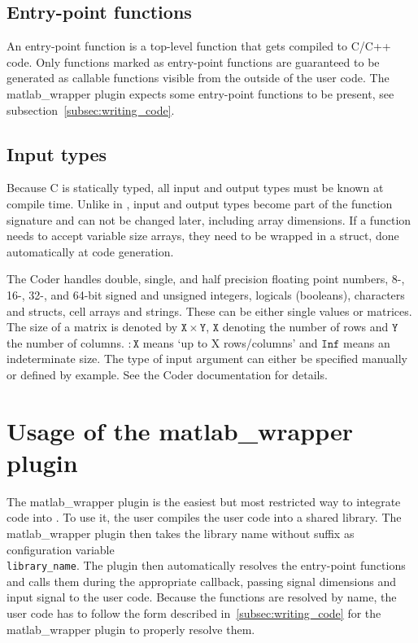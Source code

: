 \documentclass[11pt,a4paper,twoside]{article}
\newcommand{\+}{\discretionary{\mbox{\scriptsize$\hookleftarrow$}}{}{}}
\begin{document}
\subsection*{Entry-point functions}
An entry-point function is a top-level \Matlab{} function that gets compiled to
C/C++ code. Only functions marked as entry-point functions are guaranteed to be
generated as callable functions visible from the outside of the user code. The
matlab\_wrapper plugin expects some entry-point functions to be present, see
subsection~\ref{subsec:writing_code}.

\subsection*{Input types}
Because C is statically typed, all input and output types must be known at
compile time. Unlike in \Matlab{}, input and output types become part of the
function signature and can not be changed later, including array dimensions.
If a function needs to accept variable size arrays, they need to be wrapped
in a struct, done automatically at code generation.

The \Matlab{} Coder handles double, single, and half precision floating point
numbers, 8-, 16-, 32-, and 64-bit signed and unsigned integers, logicals
(booleans), characters and structs, cell arrays and strings. These can be either single values or
matrices. The size of a matrix is denoted by $\mathtt{\!X} \times \mathtt{\!Y}$, $\mathtt{\!X}$ denoting the number
of rows and $\mathtt{\!Y}$ the number of columns. $\mathtt{:\!X}$ means `up to X rows/columns' and $\mathtt{Inf}$
means an indeterminate size. The type of input argument can either be specified
manually or defined by example. See the \Matlab{} Coder documentation for
details.

\section{Usage of the matlab\_wrapper plugin}\label{sec:wrapper plugin}

The matlab\_wrapper plugin is the easiest but most restricted way to integrate
\Matlab{} code into \mha{}. To use it, the user compiles the user code into a
shared library. The matlab\_wrapper plugin then takes the library name without
suffix as configuration variable\\ \texttt{library\_name}. The plugin then automatically
resolves the entry-point functions and calls them during the appropriate
callback, passing signal dimensions and input signal to the user code. Because
the functions are resolved by name, the user code has to follow the form
described in~\ref{subsec:writing_code} for the matlab\_wrapper plugin to
properly resolve them.
\end{document}
